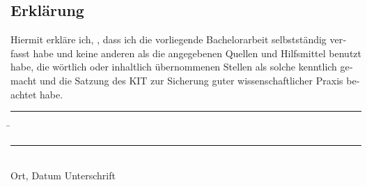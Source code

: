 \documentclass[parskip=full,12pt,a4paper,twoside,headings=openright]{scrreprt}
\begin{document}
\begin{otherlanguage}{ngerman}
\chapter*{Erklärung}
\pagestyle{empty}

  \vspace{20mm}
  Hiermit erkläre ich, \theauthor, dass ich die vorliegende Bachelorarbeit selbst\-ständig
verfasst habe und keine anderen als die angegebenen Quellen und Hilfsmittel
benutzt habe, die wörtlich oder inhaltlich übernommenen Stellen als solche kenntlich gemacht und
die Satzung des KIT zur Sicherung guter wissenschaftlicher Praxis beachtet habe.
  \vspace{20mm}
  \begin{tabbing}
  \rule{4cm}{.4pt}\hspace{1cm} \= \rule{7cm}{.4pt} \\
 Ort, Datum \> Unterschrift
  \end{tabbing}
\end{otherlanguage}

\pagestyle{fancy}
\appendix


\end{document}
